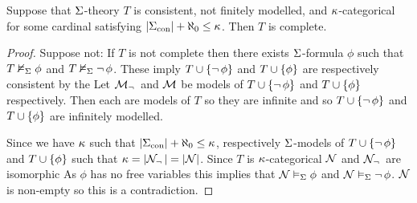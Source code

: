 \begin{prop}
    Suppose that $\Sigma$-theory $T$ is consistent, 
    not finitely modelled, and $\kappa$-categorical 
    for some cardinal satisfying 
    $|{\Sigma}_\mathrm{con}| + \aleph_0 \leq \kappa$.
    Then $T$ is complete.
\end{prop}
\begin{proof}
    Suppose not: If $T$ is not complete then there exists
    $\Sigma$-formula $\phi$ such that $T \nvDash_{\Sigma} \phi$ and 
    $T \nvDash_{\Sigma} \neg\, \phi$.
    These imply $T \cup \left\{\neg\, \phi\right\}$
    and $T \cup \left\{\phi\right\}$ are respectively consistent by the 
    Let $\mathcal{M}_\neg\,$ and $\mathcal{M}$ be models of  
    $T \cup \left\{\neg\, \phi\right\}$ and $T \cup \left\{\phi\right\}$
    respectively.
    Then each are models of $T$ so they are infinite
    and so $T \cup \left\{\neg\, \phi\right\}$ and $T \cup \left\{\phi\right\}$
    are infinitely modelled.

    Since we have $\kappa$ such that $|{\Sigma}_\mathrm{con}| + \aleph_0 \leq \kappa$, 
     respectively $\Sigma$-models of 
        $T \cup \left\{\neg\, \phi\right\}$ and $T \cup \left\{\phi\right\}$
        such that 
        $\kappa = |{\mathcal{N}_\neg\,}| = |{\mathcal{N}}|$.
    Since $T$ is $\kappa$-categorical
    $\mathcal{N}$ and $\mathcal{N}_\neg\,$ are isomorphic
    As $\phi$ has no free variables this implies that
    $\mathcal{N} \vDash_{\Sigma} \phi $ and $\mathcal{N} \vDash_{\Sigma} \neg\, \phi$.
    $\mathcal{N}$ is non-empty so this is a contradiction.
\end{proof}

